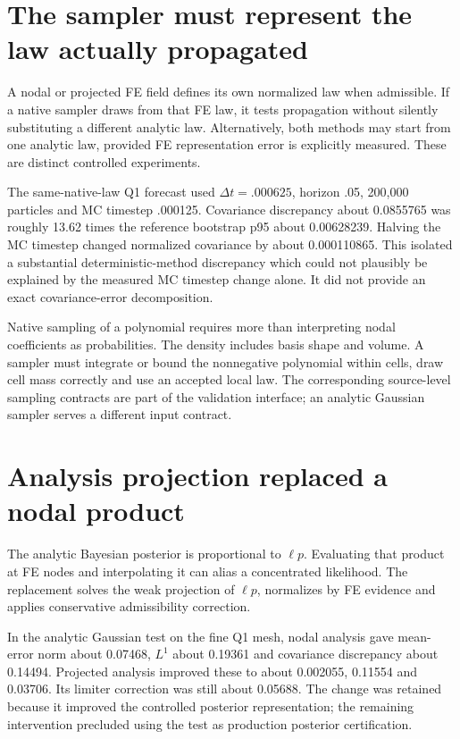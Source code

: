 \section{The sampler must represent the law actually propagated}
A nodal or projected FE field defines its own normalized law when admissible. If a native sampler draws from that FE law, it tests propagation without silently substituting a different analytic law. Alternatively, both methods may start from one analytic law, provided FE representation error is explicitly measured. These are distinct controlled experiments.

The same-native-law Q1 forecast used $\Delta t=.000625$, horizon .05, 200,000 particles and MC timestep .000125. Covariance discrepancy about 0.0855765 was roughly 13.62 times the reference bootstrap p95 about 0.00628239. Halving the MC timestep changed normalized covariance by about 0.000110865. This isolated a substantial deterministic-method discrepancy which could not plausibly be explained by the measured MC timestep change alone. It did not provide an exact covariance-error decomposition.

Native sampling of a polynomial requires more than interpreting nodal coefficients as probabilities. The density includes basis shape and volume. A sampler must integrate or bound the nonnegative polynomial within cells, draw cell mass correctly and use an accepted local law. The corresponding source-level sampling contracts are part of the validation interface; an analytic Gaussian sampler serves a different input contract.

\section{Analysis projection replaced a nodal product}
The analytic Bayesian posterior is proportional to $\ell p$. Evaluating that product at FE nodes and interpolating it can alias a concentrated likelihood. The replacement solves the weak projection of $\ell p$, normalizes by FE evidence and applies conservative admissibility correction.

In the analytic Gaussian test on the fine Q1 mesh, nodal analysis gave mean-error norm about 0.07468, $L^1$ about 0.19361 and covariance discrepancy about 0.14494. Projected analysis improved these to about 0.002055, 0.11554 and 0.03706. Its limiter correction was still about 0.05688. The change was retained because it improved the controlled posterior representation; the remaining intervention precluded using the test as production posterior certification.

